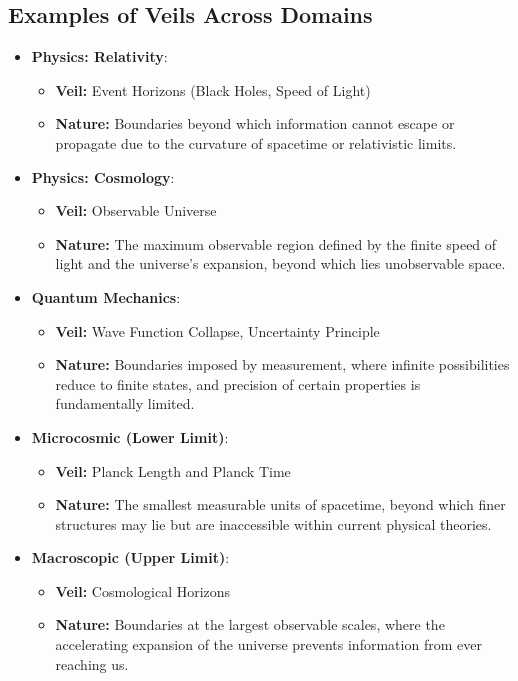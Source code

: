 \documentclass[12pt]{article}
\begin{document}
\subsection{Examples of Veils Across Domains}

\begin{itemize}
    \item \textbf{Physics: Relativity}:
    \begin{itemize}
        \item \textbf{Veil:} Event Horizons (Black Holes, Speed of Light)
        \item \textbf{Nature:} Boundaries beyond which information cannot escape or propagate due to the curvature of spacetime or relativistic limits.
    \end{itemize}

    \item \textbf{Physics: Cosmology}:
    \begin{itemize}
        \item \textbf{Veil:} Observable Universe
        \item \textbf{Nature:} The maximum observable region defined by the finite speed of light and the universe's expansion, beyond which lies unobservable space.
    \end{itemize}

    \item \textbf{Quantum Mechanics}:
    \begin{itemize}
        \item \textbf{Veil:} Wave Function Collapse, Uncertainty Principle
        \item \textbf{Nature:} Boundaries imposed by measurement, where infinite possibilities reduce to finite states, and precision of certain properties is fundamentally limited.
    \end{itemize}

    \item \textbf{Microcosmic (Lower Limit)}:
    \begin{itemize}
        \item \textbf{Veil:} Planck Length and Planck Time
        \item \textbf{Nature:} The smallest measurable units of spacetime, beyond which finer structures may lie but are inaccessible within current physical theories.
    \end{itemize}

    \item \textbf{Macroscopic (Upper Limit)}:
    \begin{itemize}
        \item \textbf{Veil:} Cosmological Horizons
        \item \textbf{Nature:} Boundaries at the largest observable scales, where the accelerating expansion of the universe prevents information from ever reaching us.
    \end{itemize}


\end{itemize}
\end{document}
